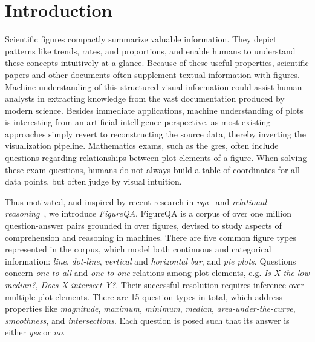 \documentclass{article} \usepackage{iclr2018_workshop,times}
\begin{document}
\section{Introduction}
Scientific figures compactly summarize valuable information. They depict patterns like trends, rates, and proportions, and enable humans to understand these concepts intuitively at a glance.
Because of these useful properties, scientific papers and other documents often supplement textual information with figures.
Machine understanding of this structured visual information could assist human analysts in extracting knowledge from the vast documentation produced by modern science. 
Besides immediate applications, machine understanding of plots is interesting from an artificial intelligence perspective, as most existing approaches simply revert to reconstructing the source data, thereby inverting the visualization pipeline. Mathematics exams, such as the \glspl{gre}, often include questions regarding relationships between plot elements of a figure. When solving these exam questions, humans do not always build a table of coordinates for all data points, but often judge by visual intuition.

Thus motivated, and inspired by recent research in \emph{\gls{vqa}}~\citep{antol2015vqa,goyal2016making} and \emph{relational reasoning}~\citep{johnson2016clevr,suhr2017corpus}, we introduce \emph{FigureQA}.
FigureQA is a corpus of over one million question-answer pairs grounded in over  figures, devised to study aspects of comprehension and reasoning in machines.
There are five common figure types represented in the corpus, which model both continuous and categorical information: \emph{line}, \emph{dot-line}, \emph{vertical} and \emph{horizontal bar}, and \emph{pie plots}.
Questions concern \emph{one-to-all} and \emph{one-to-one} relations among plot elements, e.g. \emph{Is X the low median?}, \emph{Does X intersect Y?}. Their successful resolution requires inference over multiple plot elements.
There are 15 question types in total, which address properties like \emph{magnitude}, \emph{maximum}, \emph{minimum}, \emph{median}, \emph{area-under-the-curve}, \emph{smoothness}, and \emph{intersections}. Each question is posed such that its answer is either \emph{yes} or \emph{no}.
\end{document}
